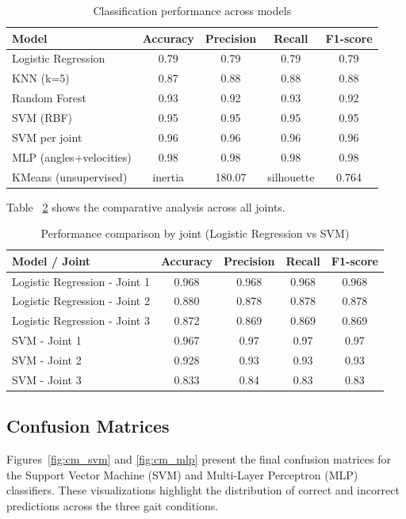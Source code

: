 \documentclass[journal]{IEEEtran}
\begin{document}
\begin{table}[h]
\centering
\caption{Classification performance across models}
\label{tab:results}
\begin{tabular}{lcccc}
\hline
\textbf{Model} & \textbf{Accuracy} & \textbf{Precision} & \textbf{Recall} & \textbf{F1-score} \\
\hline
Logistic Regression & 0.79 & 0.79 & 0.79 & 0.79 \\
KNN (k=5)           & 0.87 & 0.88 & 0.88 & 0.88 \\
Random Forest       & 0.93 & 0.92 & 0.93 & 0.92 \\
SVM (RBF)           & 0.95 & 0.95 & 0.95 & 0.95 \\
SVM per joint       & 0.96 & 0.96 & 0.96 & 0.96 \\
MLP (angles+velocities) & 0.98 & 0.98 & 0.98 & 0.98 \\
\hline
KMeans (unsupervised) & inertia & 180.07 & silhouette & 0.764\\
\hline
\end{tabular}
\end{table}

Table ~\ref{tab:joint_results} shows  the comparative analysis across all joints. 

\begin{table}[h]
\centering
\caption{Performance comparison by joint (Logistic Regression vs SVM)}
\label{tab:joint_results}
\begin{tabular}{lcccc}
\hline
\textbf{Model / Joint} & \textbf{Accuracy} & \textbf{Precision} & \textbf{Recall} & \textbf{F1-score} \\
\hline
Logistic Regression - Joint 1 & 0.968 & 0.968 & 0.968 & 0.968 \\
Logistic Regression - Joint 2 & 0.880 & 0.878 & 0.878 & 0.878 \\
Logistic Regression - Joint 3 & 0.872 & 0.869 & 0.869 & 0.869 \\
\hline
SVM - Joint 1 & 0.967 & 0.97 & 0.97 & 0.97 \\
SVM - Joint 2 & 0.928 & 0.93 & 0.93 & 0.93 \\
SVM - Joint 3 & 0.833 & 0.84 & 0.83 & 0.83 \\
\hline
\end{tabular}
\end{table}
\subsection{Confusion Matrices}
Figures~\ref{fig:cm_svm} and \ref{fig:cm_mlp} present the final confusion matrices for the Support Vector Machine (SVM) and Multi-Layer Perceptron (MLP) classifiers. 
These visualizations highlight the distribution of correct and incorrect predictions across the three gait conditions.
\end{document}

